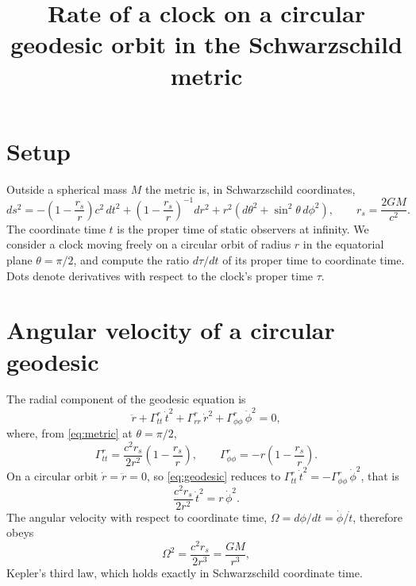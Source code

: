 \documentclass{article}
\title{Rate of a clock on a circular geodesic orbit in the Schwarzschild metric}
\date{}
\begin{document}
\maketitle

\section{Setup}
Outside a spherical mass $M$ the metric is, in Schwarzschild coordinates,
\begin{equation}
  ds^2 = -\left(1 - \frac{r_s}{r}\right)c^2\,dt^2 + \left(1 - \frac{r_s}{r}\right)^{-1}dr^2 + r^2\left(d\theta^2 + \sin^2\theta\,d\phi^2\right), \qquad r_s = \frac{2GM}{c^2} .
  \label{eq:metric}
\end{equation}
The coordinate time $t$ is the proper time of static observers at infinity. We consider a clock moving freely on a circular orbit of radius $r$ in the equatorial plane $\theta = \pi/2$, and compute the ratio $d\tau/dt$ of its proper time to coordinate time. Dots denote derivatives with respect to the clock's proper time $\tau$.

\section{Angular velocity of a circular geodesic}
The radial component of the geodesic equation is
\begin{equation}
  \ddot r + \Gamma^r_{tt}\,\dot t^2 + \Gamma^r_{rr}\,\dot r^2 + \Gamma^r_{\phi\phi}\,\dot\phi^2 = 0 ,
  \label{eq:geodesic}
\end{equation}
where, from \eqref{eq:metric} at $\theta = \pi/2$,
\begin{equation}
  \Gamma^r_{tt} = \frac{c^2 r_s}{2r^2}\left(1 - \frac{r_s}{r}\right), \qquad \Gamma^r_{\phi\phi} = -r\left(1 - \frac{r_s}{r}\right) .
  \label{eq:christoffel}
\end{equation}
On a circular orbit $\dot r = \ddot r = 0$, so \eqref{eq:geodesic} reduces to $\Gamma^r_{tt}\,\dot t^2 = -\Gamma^r_{\phi\phi}\,\dot\phi^2$, that is
\begin{equation}
  \frac{c^2 r_s}{2r^2}\,\dot t^2 = r\,\dot\phi^2 .
  \label{eq:balance}
\end{equation}
The angular velocity with respect to coordinate time, $\Omega = d\phi/dt = \dot\phi/\dot t$, therefore obeys
\begin{equation}
  \Omega^2 = \frac{c^2 r_s}{2r^3} = \frac{GM}{r^3} ,
  \label{eq:kepler}
\end{equation}
Kepler's third law, which holds exactly in Schwarzschild coordinate time.
\end{document}
